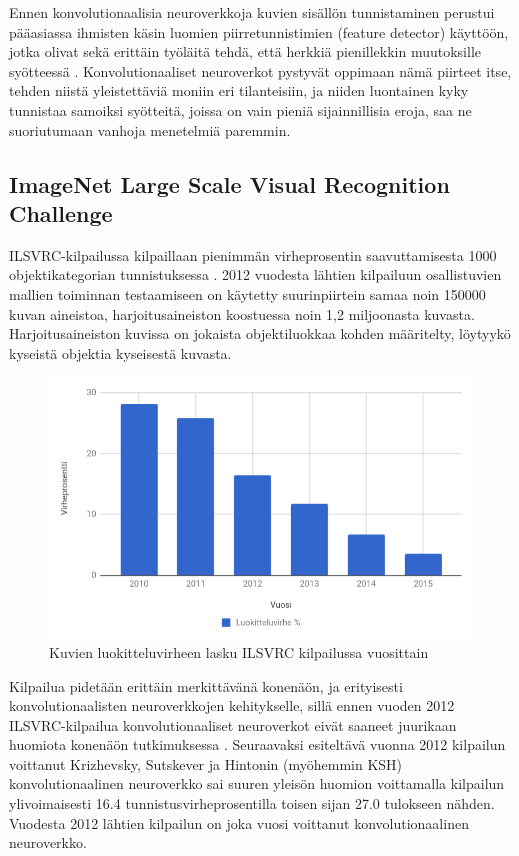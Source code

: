 \documentclass[finnish]{tktltiki2}
\theoremstyle{definition}
\theoremstyle{remark}
\begin{document}
  Ennen konvolutionaalisia neuroverkkoja kuvien sisällön tunnistaminen perustui pääasiassa ihmisten käsin luomien piirretunnistimien (feature detector) käyttöön, jotka olivat sekä erittäin työläitä tehdä, että herkkiä pienillekkin muutoksille syötteessä \cite{lecun-et-al-98-convnets}. Konvolutionaaliset neuroverkot pystyvät oppimaan nämä piirteet itse, tehden niistä yleistettäviä moniin eri tilanteisiin, ja niiden luontainen kyky tunnistaa samoiksi syötteitä, joissa on vain pieniä sijainnillisia eroja, saa ne suoriutumaan vanhoja menetelmiä paremmin. 

  \subsection{ImageNet Large Scale Visual Recognition Challenge}

  ILSVRC-kilpailussa kilpaillaan pienimmän virheprosentin saavuttamisesta 1000 objektikategorian tunnistuksessa \cite{imagenet-paper}. 2012 vuodesta lähtien kilpailuun osallistuvien mallien toiminnan testaamiseen on käytetty suurinpiirtein samaa noin 150000 kuvan aineistoa, harjoitusaineiston koostuessa noin 1,2 miljoonasta kuvasta. Harjoitusaineiston kuvissa on jokaista objektiluokkaa kohden määritelty, löytyykö kyseistä objektia kyseisestä kuvasta.

    \begin{figure}[h]
      \centering
      \includegraphics[scale=0.5]{ilsvrc-year}
      \caption{Kuvien luokitteluvirheen lasku ILSVRC kilpailussa vuosittain \cite{imagenet-paper}}
      \label{pic:ilsvrc}
    \end{figure}

    Kilpailua pidetään erittäin merkittävänä konenäön, ja erityisesti konvolutionaalisten neuroverkkojen kehitykselle, sillä ennen vuoden 2012 ILSVRC-kilpailua konvolutionaaliset neuroverkot eivät saaneet juurikaan huomiota konenäön tutkimuksessa \cite{nature-lecun15}. Seuraavaksi esiteltävä vuonna 2012 kilpailun voittanut Krizhevsky, Sutskever ja Hintonin (myöhemmin KSH) konvolutionaalinen neuroverkko sai suuren yleisön huomion voittamalla kilpailun ylivoimaisesti 16.4 tunnistusvirheprosentilla toisen sijan 27.0 tulokseen nähden. Vuodesta 2012 lähtien kilpailun on joka vuosi voittanut konvolutionaalinen neuroverkko.
\end{document}
